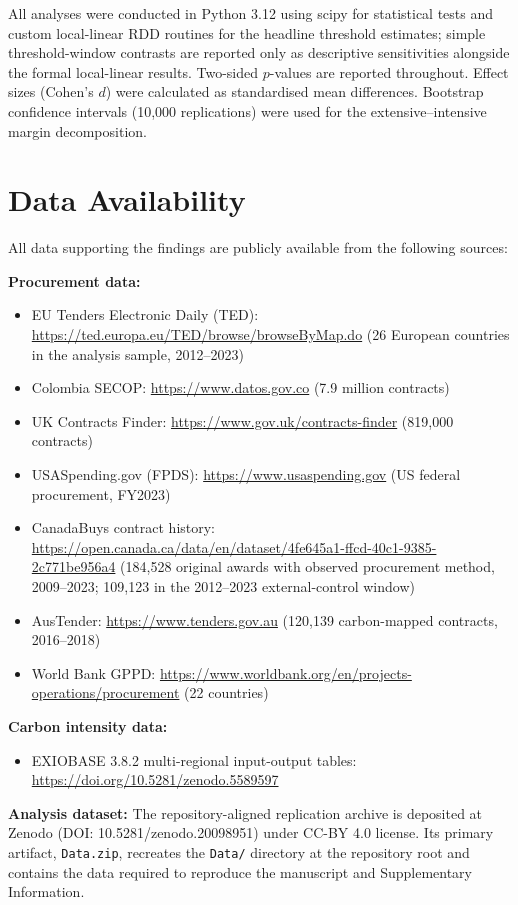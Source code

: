 \documentclass[11pt,a4paper]{article}
\begin{document}
All analyses were conducted in Python 3.12 using scipy for statistical tests and custom local-linear RDD routines for the headline threshold estimates; simple threshold-window contrasts are reported only as descriptive sensitivities alongside the formal local-linear results. Two-sided $p$-values are reported throughout. Effect sizes (Cohen's $d$) were calculated as standardised mean differences. Bootstrap confidence intervals (10,000 replications) were used for the extensive--intensive margin decomposition.


\section{Data Availability}

All data supporting the findings are publicly available from the following sources:

\textbf{Procurement data:}
\begin{itemize}[noitemsep]
\item EU Tenders Electronic Daily (TED): \url{https://ted.europa.eu/TED/browse/browseByMap.do} (26 European countries in the analysis sample, 2012--2023)
\item Colombia SECOP: \url{https://www.datos.gov.co} (7.9 million contracts)
\item UK Contracts Finder: \url{https://www.gov.uk/contracts-finder} (819,000 contracts)
\item USASpending.gov (FPDS): \url{https://www.usaspending.gov} (US federal procurement, FY2023)
\item CanadaBuys contract history: \url{https://open.canada.ca/data/en/dataset/4fe645a1-ffcd-40c1-9385-2c771be956a4} (184,528 original awards with observed procurement method, 2009--2023; 109,123 in the 2012--2023 external-control window)
\item AusTender: \url{https://www.tenders.gov.au} (120,139 carbon-mapped contracts, 2016--2018)
\item World Bank GPPD: \url{https://www.worldbank.org/en/projects-operations/procurement} (22 countries)
\end{itemize}

\textbf{Carbon intensity data:}
\begin{itemize}[noitemsep]
\item EXIOBASE 3.8.2 multi-regional input-output tables\cite{stadler2018exiobase}: \url{https://doi.org/10.5281/zenodo.5589597}
\end{itemize}

\textbf{Analysis dataset:}
The repository-aligned replication archive is deposited at Zenodo\cite{zenodo2024gprd} (DOI: 10.5281/zenodo.20098951) under CC-BY 4.0 license. Its primary artifact, \texttt{Data.zip}, recreates the \texttt{Data/} directory at the repository root and contains the data required to reproduce the manuscript and Supplementary Information.
\end{document}
